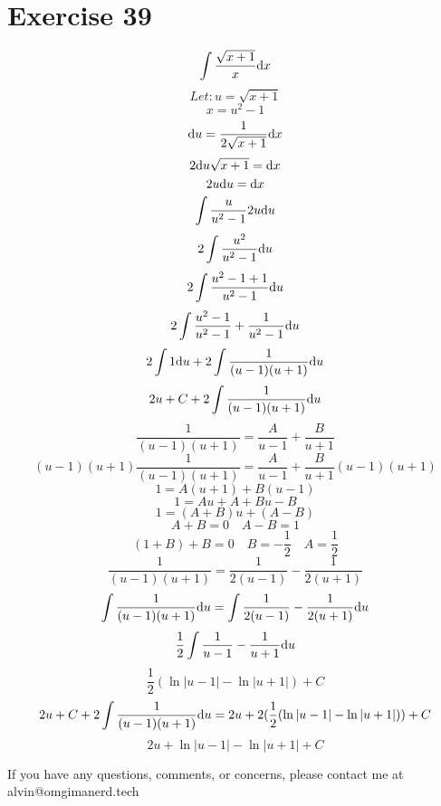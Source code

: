 \documentclass[letterpaper, 12pt]{math}
\begin{document}
\section*{Exercise 39}
\[ \int{\frac{\sqrt{x+1}}{x}\mathrm{d}{x}} \]
\[ Let: u = \sqrt{x+1} \]
\[ x = u^{2}-1 \]
\[ \mathrm{d}{u} = \frac{1}{2\sqrt{x+1}}\mathrm{d}{x} \]
\[ 2\mathrm{d}{u}\sqrt{x+1} = \mathrm{d}{x} \]
\[ 2u\mathrm{d}{u} = \mathrm{d}{x} \]
\[ \int{\frac{u}{u^{2}-1}2u\mathrm{d}{u}} \]
\[ 2\int{\frac{u^{2}}{u^{2}-1}\mathrm{d}{u}} \]
\[ 2\int{\frac{u^{2}-1+1}{u^{2}-1}\mathrm{d}{u}} \]
\[ 2\int{\frac{u^{2}-1}{u^{2}-1}+\frac{1}{u^{2}-1}\mathrm{d}{u}} \]
\[ 2\int{1\mathrm{d}{u}}+2\int{\frac{1}{(u-1)(u+1)}\mathrm{d}{u}} \]
\[ 2u+C+2\int{\frac{1}{(u-1)(u+1)}\mathrm{d}{u}} \]
\[ \frac{1}{(u-1)(u+1)} = \frac{A}{u-1}+\frac{B}{u+1} \]
\[ (u-1)(u+1)\frac{1}{(u-1)(u+1)} = \frac{A}{u-1}+\frac{B}{u+1}(u-1)(u+1) \]
\[ 1 = A(u+1)+B(u-1) \]
\[ 1 = Au+A+Bu-B \]
\[ 1 = (A+B)u+(A-B) \]
\[ A+B = 0 \quad A-B = 1 \]
\[ (1+B)+B = 0 \quad B = -\frac{1}{2} \quad A = \frac{1}{2} \]
\[ \frac{1}{(u-1)(u+1)} = \frac{1}{2(u-1)}-\frac{1}{2(u+1)} \]
\[ \int{\frac{1}{(u-1)(u+1)}\mathrm{d}{u}} =
   \int{\frac{1}{2(u-1)}-\frac{1}{2(u+1)}\mathrm{d}{u}} \]
\[ \frac{1}{2}\int{\frac{1}{u-1}-\frac{1}{u+1}\mathrm{d}{u}} \]
\[ \frac{1}{2}(\ln|u-1|-\ln|u+1|)+C \]
\[ 2u+C+2\int{\frac{1}{(u-1)(u+1)}\mathrm{d}{u}} =
   2u+2(\frac{1}{2}(\ln|u-1|-\ln|u+1|))+C \]
\[ 2u+\ln|u-1|-\ln|u+1|+C \]

\begin{center}
  If you have any questions, comments, or concerns, please contact me at
  alvin@omgimanerd.tech
\end{center}
\end{document}
